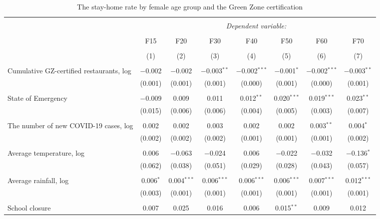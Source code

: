 
\begin{table}[!htbp] \centering 
  \caption{The stay-home rate by female age group and the Green Zone certification} 
  \label{} 
\footnotesize 
\begin{tabular}{@{\extracolsep{-11pt}}lccccccc} 
\\[-1.8ex]\hline 
\hline \\[-1.8ex] 
 & \multicolumn{7}{c}{\textit{Dependent variable:}} \\ 
\cline{2-8} 
\\[-1.8ex] & F15 & F20 & F30 & F40 & F50 & F60 & F70 \\ 
\\[-1.8ex] & (1) & (2) & (3) & (4) & (5) & (6) & (7)\\ 
\hline \\[-1.8ex] 
 Cumulative GZ-certified restaurants, log & $-$0.002 & $-$0.002 & $-$0.003$^{**}$ & $-$0.002$^{***}$ & $-$0.001$^{*}$ & $-$0.002$^{***}$ & $-$0.003$^{**}$ \\ 
  & (0.001) & (0.001) & (0.001) & (0.000) & (0.001) & (0.000) & (0.001) \\ 
  & & & & & & & \\ 
 State of Emergency & $-$0.009 & 0.009 & 0.011 & 0.012$^{**}$ & 0.020$^{***}$ & 0.019$^{***}$ & 0.023$^{**}$ \\ 
  & (0.015) & (0.006) & (0.006) & (0.004) & (0.005) & (0.003) & (0.007) \\ 
  & & & & & & & \\ 
 The number of new COVID-19 cases, log & 0.002 & 0.002 & 0.003 & 0.002 & 0.002 & 0.003$^{**}$ & 0.004$^{*}$ \\ 
  & (0.002) & (0.002) & (0.002) & (0.001) & (0.001) & (0.001) & (0.002) \\ 
  & & & & & & & \\ 
 Average temperature, log & 0.006 & $-$0.063 & $-$0.024 & 0.006 & $-$0.022 & $-$0.032 & $-$0.136$^{*}$ \\ 
  & (0.062) & (0.038) & (0.051) & (0.029) & (0.028) & (0.043) & (0.057) \\ 
  & & & & & & & \\ 
 Average rainfall, log & 0.006$^{*}$ & 0.004$^{***}$ & 0.006$^{***}$ & 0.006$^{***}$ & 0.006$^{***}$ & 0.007$^{***}$ & 0.012$^{***}$ \\ 
  & (0.003) & (0.001) & (0.001) & (0.001) & (0.001) & (0.001) & (0.001) \\ 
  & & & & & & & \\ 
 School closure & 0.007 & 0.025 & 0.016 & 0.006 & 0.015$^{**}$ & 0.009 & 0.012 \\ 

\end{tabular}
\end{table}
